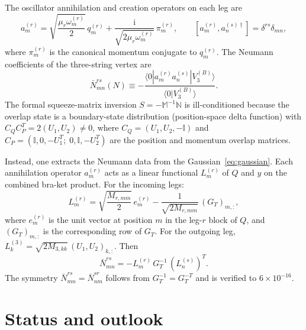 \documentclass[11pt]{article}
\newcommand{\ii}{\mathrm{i}}
\begin{document}
The oscillator annihilation and creation operators on each leg are
\begin{equation}
a_m^{(r)} = \sqrt{\frac{\mu_r\omega_m^{(r)}}{2}}\,q_m^{(r)} + \frac{\ii}{\sqrt{2\mu_r\omega_m^{(r)}}}\,\pi_m^{(r)},
\qquad
[a_m^{(r)}, a_n^{(s)\dagger}] = \delta^{rs}\delta_{mn},
\label{eq:oscillators}
\end{equation}
where $\pi_m^{(r)}$ is the canonical momentum conjugate to $q_m^{(r)}$. The Neumann coefficients of the three-string vertex are
\begin{equation}
\bar N^{rs}_{mn}(N) \equiv -\frac{\langle 0|a_m^{(r)}a_n^{(s)}|V_3^{(B)}\rangle}{\langle 0|V_3^{(B)}\rangle}.
\label{eq:neumann-def}
\end{equation}
The formal squeeze-matrix inversion $S = -\mathbb{M}^{-1}\mathbb{N}$ is ill-conditioned because the overlap state is a boundary-state distribution (position-space delta function) with $C_Q C_P^T = 2(U_1, U_2) \neq 0$, where $C_Q = (U_1, U_2, -\mathbb{I})$ and $C_P = (\mathbb{I}, 0, -U_1^T;\;0, \mathbb{I}, -U_2^T)$ are the position and momentum overlap matrices.

Instead, one extracts the Neumann data from the Gaussian~\eqref{eq:gaussian}. Each annihilation operator $a_m^{(r)}$ acts as a linear functional $L_m^{(r)}$ of $Q$ and $y$ on the combined bra-ket product. For the incoming legs:
\begin{equation}
L_m^{(r)} = \sqrt{\frac{M_{r,mm}}{2}}\,e_m^{(r)} - \frac{1}{\sqrt{2M_{r,mm}}}\,(G_T)_{m,:},
\label{eq:Lr}
\end{equation}
where $e_m^{(r)}$ is the unit vector at position $m$ in the leg-$r$ block of $Q$, and $(G_T)_{m,:}$ is the corresponding row of $G_T$. For the outgoing leg, $L_k^{(3)} = \sqrt{2M_{3,kk}}\,(U_1, U_2)_{k,:}$. Then
\begin{equation}
\bar N^{rs}_{mn} = -L_m^{(r)}\,G_T^{-1}\,(L_n^{(s)})^T.
\label{eq:neumann-formula}
\end{equation}
The symmetry $\bar N^{rs}_{mn} = \bar N^{sr}_{nm}$ follows from $G_T^{-1} = G_T^{-T}$ and is verified to $6 \times 10^{-16}$.

\section{Status and outlook}
\label{sec:outlook}
\end{document}
